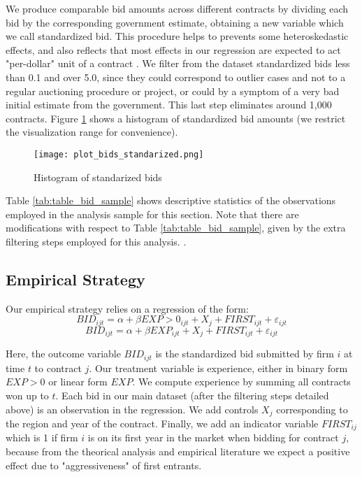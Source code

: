 We produce comparable bid amounts across different contracts by dividing each bid by the corresponding government estimate, obtaining a new variable which we call standardized bid. This procedure helps to prevents some heteroskedastic effects, and also reflects that most effects in our regression are expected to act "per-dollar" unit of a contract \citep{bajari2014bidding}. We filter from the dataset standardized bids less than 0.1 and over 5.0, since they could correspond to outlier cases and not to a regular auctioning procedure or project, or could by a symptom of a very bad initial estimate from the government. This last step eliminates around 1,000 contracts. Figure \ref{fig:plot_bids_standarized} shows a histogram of standardized bid amounts (we restrict the visualization range for convenience).

\begin{figure}
  \centering
  \texttt{[image: plot\_bids\_standarized.png]}
  \caption{Histogram of standarized bids}
  \label{fig:plot_bids_standarized}
\end{figure}

Table \ref{tab:table_bid_sample} shows descriptive statistics of the observations employed in the analysis sample for this section. Note that there are modifications with respect to Table \ref{tab:table_bid_sample}, given by the extra filtering steps employed for this analysis. .

\subsection{Empirical Strategy}

Our empirical strategy relies on a regression of the form:
\begin{equation}
\label{eqn:olsbids}
BID_{ijt}=\alpha+ \beta EXP>0_{ijt}+X_j+FIRST_{ijt}+\varepsilon_{ijt}
\end{equation}
\begin{equation}
\label{eqn:olsbids2}
BID_{ijt}=\alpha+ \beta EXP_{ijt}+X_j+FIRST_{ijt}+\varepsilon_{ijt}
\end{equation}

Here, the outcome variable $BID_{ijt}$ is the standardized bid submitted by firm  $i$ at time $t$  to contract $j$. Our treatment variable is experience, either in binary form $EXP>0$ or linear form $EXP$. We compute experience by summing all contracts won up to $t$. Each bid in our main dataset (after the filtering steps detailed above) is an observation in the regression. We add controls $X_j$ corresponding to the region and year of the contract. Finally, we add an indicator variable $FIRST_{ij}$ which is 1 if firm $i$ is on its first year in the market when bidding for contract $j$, because from the theorical analysis and empirical literature we expect a positive effect due to "aggressiveness" of first entrants.


